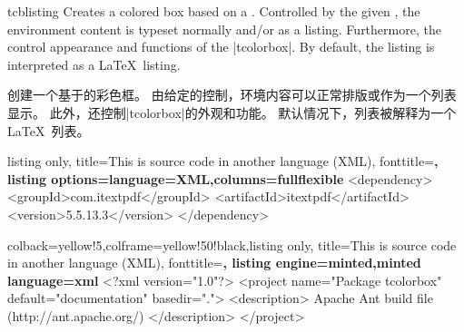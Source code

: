 \begin{docEnvironment}{tcblisting}{}
Creates a colored box based on a .
Controlled by the given , the
environment content is typeset normally and/or as a listing.
Furthermore, the  control appearance and functions of
the |tcolorbox|.
By default, the listing is interpreted as a \LaTeX\ listing.

创建一个基于的彩色框。 由给定的控制，环境内容可以正常排版或作为一个列表显示。 此外，还控制|tcolorbox|的外观和功能。 默认情况下，列表被解释为一个\LaTeX\ 列表。


\begin{dispExample}
\begin{tcblisting}{listing only,
title=This is source code in another language (XML), fonttitle=\bfseries,
listing options={language=XML,columns=fullflexible}}
<dependency>
  <groupId>com.itextpdf</groupId>
  <artifactId>itextpdf</artifactId>
  <version>5.5.13.3</version>
</dependency>
\end{tcblisting}
\end{dispExample}



\begin{dispExample}
\begin{tcblisting}{colback=yellow!5,colframe=yellow!50!black,listing only,
title=This is source code in another language (XML), fonttitle=\bfseries,
listing engine=minted,minted language=xml}
<?xml version="1.0"?>
<project name="Package tcolorbox" default="documentation" basedir=".">
<description>
Apache Ant build file (http://ant.apache.org/)
</description>
</project>
\end{tcblisting}
\end{dispExample}




\end{docEnvironment}
